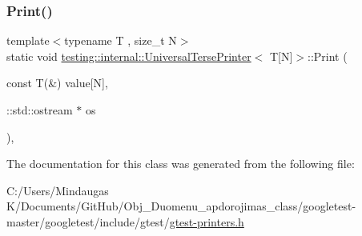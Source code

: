 \subsubsection{\texorpdfstring{Print()}{Print()}\hspace{0.1cm}{\footnotesize\ttfamily [3/3]}}
{\footnotesize\ttfamily template$<$typename T , size\+\_\+t N$>$ \\
static void \mbox{\hyperlink{classtesting_1_1internal_1_1_universal_terse_printer}{testing\+::internal\+::\+Universal\+Terse\+Printer}}$<$ T\mbox{[}N\mbox{]}$>$\+::Print (\begin{DoxyParamCaption}\item[{const T(\&)}]{value\mbox{[}\+N\mbox{]},  }\item[{\+::std\+::ostream $\ast$}]{os }\end{DoxyParamCaption})\hspace{0.3cm}{\ttfamily [inline]}, {\ttfamily [static]}}



The documentation for this class was generated from the following file\+:\begin{DoxyCompactItemize}
\item 
C\+:/\+Users/\+Mindaugas K/\+Documents/\+Git\+Hub/\+Obj\+\_\+\+Duomenu\+\_\+apdorojimas\+\_\+class/googletest-\/master/googletest/include/gtest/\mbox{\hyperlink{googletest-master_2googletest_2include_2gtest_2gtest-printers_8h}{gtest-\/printers.\+h}}\end{DoxyCompactItemize}
